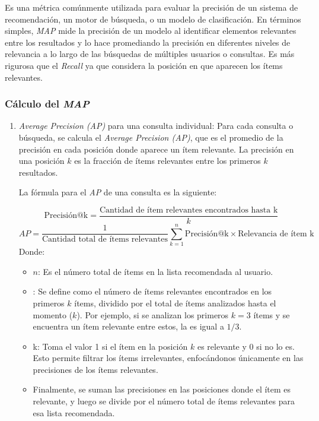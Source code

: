\documentclass[11pt,a4paper,twoside]{thesis}
\begin{document}
Es una métrica comúnmente utilizada para evaluar la precisión de un sistema de recomendación, un motor de búsqueda, o un modelo de clasificación. En términos simples, \textit{MAP} mide la precisión de un modelo al identificar elementos relevantes entre los resultados y lo hace promediando la precisión en diferentes niveles de relevancia a lo largo de las búsquedas de múltiples usuarios o consultas. Es más rigurosa que el \textit{Recall} ya que considera la posición en que aparecen los ítems relevantes.

\subsubsection{Cálculo del \textit{MAP}}

\begin{enumerate}
	\item \textit{Average Precision (AP)} para una consulta individual: Para cada consulta o búsqueda, se calcula el \textit{Average Precision (AP)}, que es el promedio de la precisión en cada posición donde aparece un ítem relevante. La precisión en una posición \( k \) es la fracción de ítems relevantes entre los primeros \( k \) resultados.

	      La fórmula para el \textit{AP} de una consulta es la siguiente:

	      \[
		      \text{Precisión@k} = \frac{\text{Cantidad de ítem relevantes encontrados hasta k}}{k}
	      \]
	      \[
		      AP = \frac{1}{\text{Cantidad total de ítems relevantes}} \sum_{k=1}^{n} \text{Precisión@k} \times \text{Relevancia de ítem k}
	      \]
	      Donde:
	      \begin{itemize}
		      \item $n$: Es el número total de ítems en la lista recomendada al usuario.
		      \item {}: Se define como el número de ítems relevantes encontrados en los primeros \( k \) ítems, dividido por el total de ítems analizados hasta el momento ($k$). Por ejemplo, si se analizan los primeros \( k=3 \) ítems y se encuentra un ítem relevante entre estos, la  es igual a \( 1/3 \).
		      \item {} k: Toma el valor 1 si el ítem en la posición \( k \) es relevante y $0$ si no lo es. Esto permite filtrar los ítems irrelevantes, enfocándonos únicamente en las precisiones de los ítems relevantes.
		      \item Finalmente, se suman las precisiones en las posiciones donde el ítem es relevante, y luego se divide por el número total de ítems relevantes para esa lista recomendada.
	      \end{itemize}


\end{enumerate}
\end{document}
